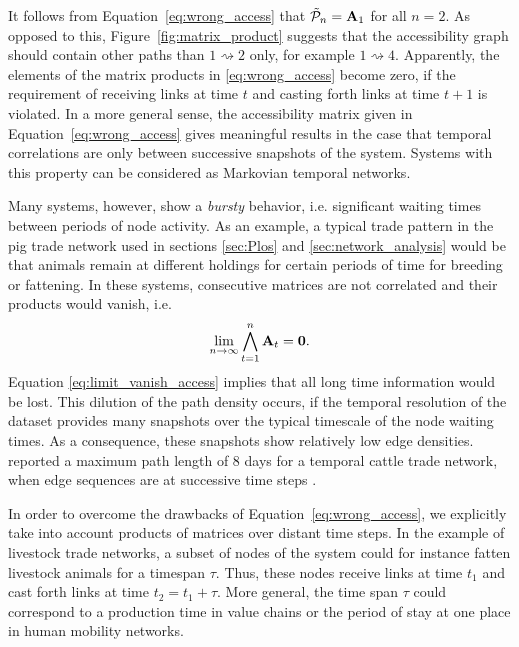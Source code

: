 It follows from Equation~\eqref{eq:wrong_access} that $\tilde{\mathcal{P}}_n =\mathbf{A}_1$ for all $n=2$. 
As opposed to this, Figure~\ref{fig:matrix_product} suggests that the accessibility graph should contain other paths than $1\rightsquigarrow 2$ only, for example $1\rightsquigarrow 4$.
Apparently, the elements of the matrix products in \eqref{eq:wrong_access} become zero, if the requirement of receiving links at time $t$ and casting forth links at time $t+1$ is violated.
In a more general sense, the accessibility matrix given in Equation~\eqref{eq:wrong_access} gives meaningful results in the case that temporal correlations are only between successive snapshots of the system.
Systems with this property can be considered as Markovian temporal networks.

Many systems, however, show a \emph{bursty} behavior, i.e. significant waiting times between periods of node activity.
As an example, a typical trade pattern in the pig trade network used in sections \ref{sec:Plos} and \ref{sec:network_analysis} would be that animals remain at different holdings for certain periods of time for breeding or fattening. 
In these systems, consecutive matrices are not correlated and their products would vanish, i.e.
\begin{equation}\label{eq:limit_vanish_access}
\lim _{n\rightarrow \infty } \bigwedge _{t=1} ^n \mathbf{A}_t =\mathbf{0}.
\end{equation}
Equation \eqref{eq:limit_vanish_access} implies that all long time information would be lost.
This dilution of the path density occurs, if the temporal resolution of the dataset provides many snapshots over the typical timescale of the node waiting times.
As a consequence, these snapshots show relatively low edge densities.
\citeauthor{Bajardi:2011iv} reported a maximum path length of 8 days for a temporal cattle trade network, when edge sequences are at successive time steps \citep{Bajardi:2011iv}.

In order to overcome the drawbacks of Equation~\eqref{eq:wrong_access}, we explicitly take into account products of matrices over distant time steps.
In the example of livestock trade networks, a subset of nodes of the system could for instance fatten livestock animals for a timespan $\tau $.
Thus, these nodes receive links at time $t_1$ and cast forth links at time $t_2=t_1+\tau $.
More general, the time span $\tau $ could correspond to a production time in value chains or the period of stay at one place in human mobility networks.

